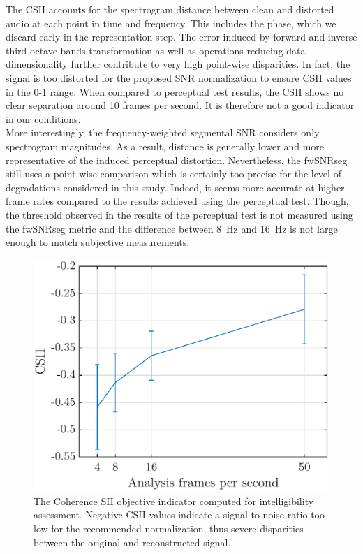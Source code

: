 \documentclass[final,3p,times,twocolumn]{elsarticle}
\begin{document}
The CSII accounts for the spectrogram distance between clean and distorted audio at each point in time and frequency. This includes the phase, which we discard early in the representation step. The error induced by forward and inverse third-octave bands transformation as well as operations reducing data dimensionality further contribute to very high point-wise disparities. In fact, the signal is too distorted for the proposed SNR normalization to ensure CSII values in the 0-1 range. When compared to perceptual test results, the CSII shows no clear separation around 10 frames per second. It is therefore not a good indicator in our conditions.\\

More interestingly, the frequency-weighted segmental SNR considers only spectrogram magnitudes. As a result, distance is generally lower and more representative of the induced perceptual distortion. Nevertheless, the fwSNRseg still uses a point-wise comparison which is certainly too precise for the level of degradations considered in this study. Indeed, it seems more accurate at higher frame rates compared to the results achieved using the perceptual test. Though, the threshold observed in the results of the perceptual test is not measured using the fwSNRseg metric and the difference between 8~Hz and 16~Hz is not large enough to match subjective measurements.\\


\begin{figure}[htbp]
	\centering
		\includegraphics[width=\columnwidth]{figures/csii_tob_fps.eps}
	\caption{The Coherence SII objective indicator computed for intelligibility assessment. Negative CSII values indicate a signal-to-noise ratio too low for the recommended normalization, thus severe disparities between the original and reconstructed signal.}
	\label{fig:csii_tob_fps}
\end{figure}
\end{document}
